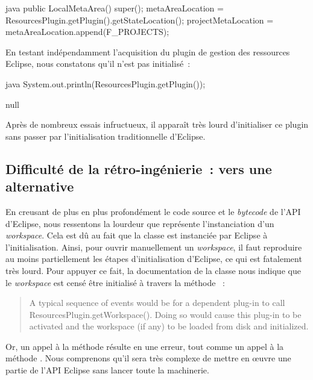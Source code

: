 \begin{imtaCode}{java}
public LocalMetaArea() {
    super();
    metaAreaLocation = ResourcesPlugin.getPlugin().getStateLocation();
    projectMetaLocation = metaAreaLocation.append(F_PROJECTS);
}
\end{imtaCode}

En testant indépendamment l'acquisition du plugin de gestion des ressources Eclipse, nous constatons qu'il n'est pas initialisé~:

\begin{imtaCode}{java}
System.out.println(ResourcesPlugin.getPlugin());
\end{imtaCode}
\vspace{-0.5cm}
\begin{imtaConsole}
null
\end{imtaConsole}

Après de nombreux essais infructueux, il apparaît très lourd d'initialiser ce plugin sans passer par l'initialisation traditionnelle d'Eclipse.


\subsection{Difficulté de la rétro-ingénierie~: vers une alternative}

En creusant de plus en plus profondément le code source et le \textit{bytecode} de l'API d'Eclipse, nous ressentons la lourdeur que représente l'instanciation d'un \textit{workspace}.
Cela est dû au fait que la classe  est instanciée par Eclipse à l'initialisation.
Ainsi, pour ouvrir manuellement un \textit{workspace}, il faut reproduire au moins partiellement les étapes d'initialisation d'Eclipse, ce qui est fatalement très lourd.
Pour appuyer ce fait, la documentation de la classe  \cite{eclipseresourcesplugin} nous indique que le \textit{workspace} est censé être initialisé à travers la méthode %
~:

\begin{quote}
A typical sequence of events would be for a dependent plug-in to call ResourcesPlugin.getWorkspace().
Doing so would cause this plug-in to be activated and the workspace (if any) to be loaded from disk and initialized.
\end{quote}

Or, un appel à la méthode  résulte en une erreur, tout comme un appel à la méthode .
Nous comprenons qu'il sera très complexe de mettre en œuvre une partie de l'API Eclipse sans lancer toute la machinerie.

